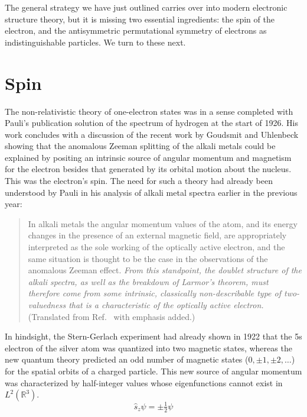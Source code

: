 The general strategy we have just outlined carries over into modern electronic
structure theory, but it is missing two essential ingredients: the spin of the
electron, and the antisymmetric permutational symmetry of electrons as
indistinguishable particles.
We turn to these next.


\section{Spin}

The non-relativistic theory of one-electron states was in a sense completed with
Pauli's publication solution of the spectrum of hydrogen at the start of
1926.\cite{Pauli:1926p336}
His work concludes with a discussion of the recent work by Goudsmit and
Uhlenbeck\cite{Uhlenbeck:1925p953} showing that the anomalous Zeeman splitting
of the alkali metals could be explained by positing an intrinsic source of
angular momentum and magnetism for the electron besides that generated by its
orbital motion about the nucleus.
This was the electron's spin.
The need for such a theory had already been understood by Pauli in his analysis
of alkali metal spectra earlier in the previous year:
\begin{quote}
    In alkali metals the angular momentum values of the atom, and its energy
    changes in the presence of an external magnetic field, are appropriately
    interpreted as the sole working of the optically active electron, and the
    same situation is thought to be the case in the observations of the
    anomalous Zeeman effect.
    \emph{%
        From this standpoint, the doublet structure of the alkali
        spectra, as well as the breakdown of Larmor's theorem, must
        therefore come from some intrinsic, classically non-describable
        type of two-valuedness that is a characteristic of the optically
        active electron.
    }
    (Translated from Ref.~ with emphasis added.)
\end{quote}
In hindsight, the Stern-Gerlach experiment\cite{Gerlach:1922p349} had already
shown in 1922 that the 5s electron of the silver atom was quantized into two
magnetic states, whereas the new quantum theory predicted an odd number of
magnetic states (\(0, \pm1, \pm2, \dots\)) for the spatial orbits of a charged
particle.
This new source of angular momentum was characterized by half-integer values
whose eigenfunctions cannot exist in \(L^2(\mathbb{R}^3)\).
\begin{equation}
    \hat{s}_z
    \psi
    =
    \pm
    \tfrac{1}{2}
    \psi
\end{equation}
